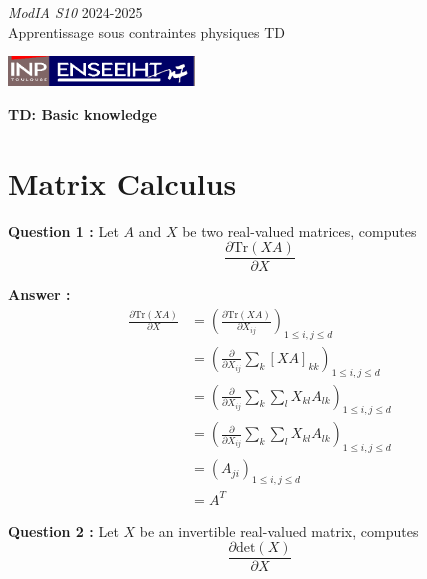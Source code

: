 \documentclass[12pt,a4paper]{article}
\newcommand{\entete}{
    \noindent\textit{ModIA S10} \hfill {2024-2025} \\
    {Apprentissage sous contraintes physiques} \hfill {TD} \\
    \begin{center}
        \includegraphics[height=0.8cm]{src/inp_n7.png}
    \end{center}
    \begin{center}
        \textbf{\LARGE TD: Basic knowledge}
    \end{center}
}
\begin{document}
\entete

\section{Matrix Calculus}

\noindent\textbf{Question 1 :}
Let $A$ and $X$ be two real-valued matrices, computes
$$
\frac{\partial \text{Tr}(XA)}{\partial X}
$$

\color{blue}

\noindent\textbf{Answer :}
\begin{align*}
    \frac{\partial \text{Tr}(XA)}{\partial X} &= \left(\frac{\partial \text{Tr}(XA)}{\partial X_{ij}}\right)_{1\leq i,j\leq d} \\
    &= \left(\frac{\partial}{\partial X_{ij}}\sum_{k}\left[XA\right]_{kk}\right)_{1\leq i,j\leq d} \\
    &= \left(\frac{\partial}{\partial X_{ij}}\sum_{k} \sum_{l}X_{kl}A_{lk}\right)_{1\leq i,j\leq d} \\
    &= \left(\frac{\partial}{\partial X_{ij}}\sum_{k} \sum_{l}X_{kl}A_{lk}\right)_{1\leq i,j\leq d} \\
    &= \left(A_{ji}\right)_{1\leq i,j\leq d} \\
    &= A^T
\end{align*}

\color{black}

\noindent\textbf{Question 2 :}
Let $X$ be an invertible real-valued matrix, computes
$$
\frac{\partial \text{det}(X)}{\partial X}
$$

\color{blue}
\end{document}
